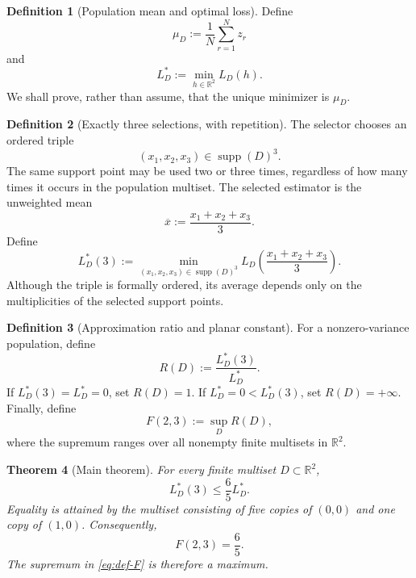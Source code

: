 \documentclass[11pt]{article}
\newtheorem{theorem}{Theorem}[section]
\theoremstyle{definition}
\newtheorem{definition}[theorem]{Definition}
\theoremstyle{remark}
\newcommand{\R}{\mathbb{R}}
\newcommand{\supp}{\operatorname{supp}}
\begin{document}
\begin{definition}[Population mean and optimal loss]
Define
\begin{equation}
\mu_D:=\frac1N\sum_{r=1}^N z_r
\label{eq:def-mean}
\end{equation}
and
\begin{equation}
L_D^*:=\min_{h\in\R^2}L_D(h).
\label{eq:def-optimal-loss}
\end{equation}
We shall prove, rather than assume, that the unique minimizer is $\mu_D$.
\end{definition}

\begin{definition}[Exactly three selections, with repetition]
The selector chooses an ordered triple
\[
(x_1,x_2,x_3)\in\supp(D)^3.
\]
The same support point may be used two or three times, regardless of how many times it occurs in the population multiset.  The selected estimator is the unweighted mean
\[
\overline{x}:=\frac{x_1+x_2+x_3}{3}.
\]
Define
\begin{equation}
L_D^*(3):=
\min_{(x_1,x_2,x_3)\in\supp(D)^3}
L_D\!\left(\frac{x_1+x_2+x_3}{3}\right).
\label{eq:def-selected-loss}
\end{equation}
Although the triple is formally ordered, its average depends only on the multiplicities of the selected support points.
\end{definition}

\begin{definition}[Approximation ratio and planar constant]
For a nonzero-variance population, define
\[
R(D):=\frac{L_D^*(3)}{L_D^*}.
\]
If $L_D^*(3)=L_D^*=0$, set $R(D)=1$.  If $L_D^*=0<L_D^*(3)$, set $R(D)=+\infty$.  Finally, define
\begin{equation}
F(2,3):=\sup_D R(D),
\label{eq:def-F}
\end{equation}
where the supremum ranges over all nonempty finite multisets in $\R^2$.
\end{definition}

\begin{theorem}[Main theorem]
For every finite multiset $D\subset\R^2$,
\begin{equation}
L_D^*(3)\le \frac65 L_D^*.
\label{eq:main-upper}
\end{equation}
Equality is attained by the multiset consisting of five copies of $(0,0)$ and one copy of $(1,0)$.  Consequently,
\begin{equation}
\boxed{F(2,3)=\frac65}.
\label{eq:main-value}
\end{equation}
The supremum in \eqref{eq:def-F} is therefore a maximum.
\end{theorem}
\end{document}
